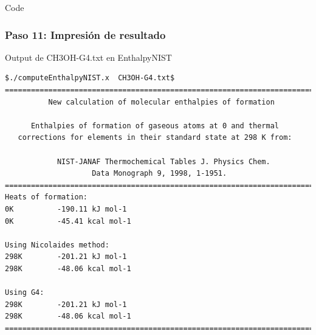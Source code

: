\documentclass{beamer}
\begin{document}

\begin{frame}[fragile]{Code}
\frametitle{Paso 11: Impresión de resultado}

\begin{block}{Output de CH3OH-G4.txt en EnthalpyNIST}
\begin{lstlisting}
$./computeEnthalpyNIST.x  CH3OH-G4.txt$
========================================================================
          New calculation of molecular enthalpies of formation

      Enthalpies of formation of gaseous atoms at 0 and thermal 
   corrections for elements in their standard state at 298 K from:

            NIST-JANAF Thermochemical Tables J. Physics Chem. 
                    Data Monograph 9, 1998, 1-1951.
========================================================================
Heats of formation:
0K          -190.11 kJ mol-1
0K          -45.41 kcal mol-1

Using Nicolaides method:
298K        -201.21 kJ mol-1
298K        -48.06 kcal mol-1

Using G4: 
298K        -201.21 kJ mol-1
298K        -48.06 kcal mol-1
========================================================================
\end{lstlisting}
\end{block}
\end{frame}


\end{document}
